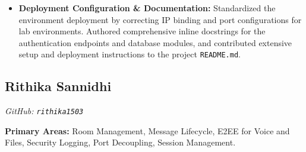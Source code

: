 \documentclass[12pt, a4paper]{article}
\begin{document}
\begin{itemize}[leftmargin=*]
    \item \textbf{Deployment Configuration \& Documentation:} Standardized the environment deployment by correcting IP binding and port configurations for lab environments. Authored comprehensive inline docstrings for the authentication endpoints and database modules, and contributed extensive setup and deployment instructions to the project \texttt{README.md}.
\end{itemize}

\subsection{Rithika Sannidhi}
\textit{GitHub: \texttt{rithika1503}}

\textbf{Primary Areas:} Room Management, Message Lifecycle, E2EE for Voice and Files, Security Logging, Port Decoupling, Session Management.
\end{document}
